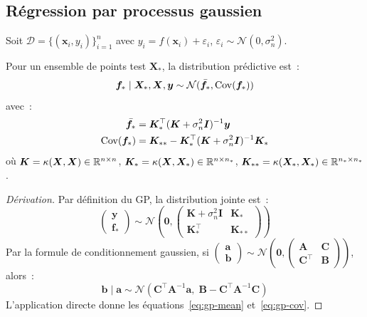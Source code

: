 \subsection{R\'egression par processus gaussien}

Soit $\mathcal{D} = \{(\bm{x}_i, y_i)\}_{i=1}^n$ avec
$y_i = f(\bm{x}_i) + \varepsilon_i$, $\varepsilon_i \sim
\mathcal{N}(0, \sigma_n^2)$.

\begin{formules}[title=\textbf{R\'egression GP --- Formules pr\'edictives}]
Pour un ensemble de points test $\bm{X}_*$, la distribution pr\'edictive
est~:
\begin{equation}
  \bm{f}_* \mid \bm{X}_*, \bm{X}, \bm{y} \sim
  \mathcal{N}(\bar{\bm{f}}_*, \mathrm{Cov}(\bm{f}_*))
\end{equation}
avec~:
\begin{align}
  \bar{\bm{f}}_* &= \bm{K}_*^\top (\bm{K} + \sigma_n^2 \bm{I})^{-1} \bm{y}
  \label{eq:gp-mean} \\
  \mathrm{Cov}(\bm{f}_*) &= \bm{K}_{**} - \bm{K}_*^\top (\bm{K} + \sigma_n^2
  \bm{I})^{-1} \bm{K}_*
  \label{eq:gp-cov}
\end{align}
o\`u $\bm{K} = \kappa(\bm{X}, \bm{X}) \in \mathbb{R}^{n \times n}$,
$\bm{K}_* = \kappa(\bm{X}, \bm{X}_*) \in \mathbb{R}^{n \times n_*}$,
$\bm{K}_{**} = \kappa(\bm{X}_*, \bm{X}_*) \in \mathbb{R}^{n_* \times n_*}$.
\end{formules}

\begin{proof}[D\'erivation]
Par d\'efinition du GP, la distribution jointe est~:
\begin{equation}
  \begin{pmatrix} \bm{y} \\ \bm{f}_* \end{pmatrix} \sim
  \mathcal{N}\!\left(\bm{0},
  \begin{pmatrix}
    \bm{K} + \sigma_n^2\bm{I} & \bm{K}_* \\
    \bm{K}_*^\top & \bm{K}_{**}
  \end{pmatrix}\right)
\end{equation}
Par la formule de conditionnement gaussien, si
$\begin{pmatrix} \bm{a} \\ \bm{b} \end{pmatrix} \sim
\mathcal{N}\!\left(\bm{0},
\begin{pmatrix} \bm{A} & \bm{C} \\ \bm{C}^\top & \bm{B}
\end{pmatrix}\right)$, alors~:
\begin{equation}
  \bm{b} \mid \bm{a} \sim \mathcal{N}(\bm{C}^\top \bm{A}^{-1}\bm{a},\;
  \bm{B} - \bm{C}^\top \bm{A}^{-1}\bm{C})
\end{equation}
L'application directe donne les \'equations~\eqref{eq:gp-mean}
et~\eqref{eq:gp-cov}.
\end{proof}

